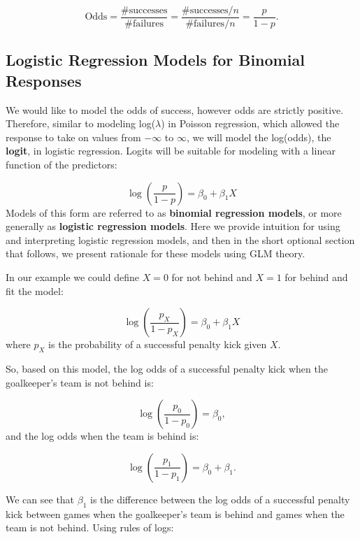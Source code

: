 \documentclass[
]{krantz}
\begin{document}
\[\textrm{Odds} = \frac{\# \textrm{successes}}{\# \textrm{failures}}=
\frac{\# \textrm{successes}/n}{\# \textrm{failures}/n}=
\frac{p}{1-p}.\]

\hypertarget{logistic-regression-models-for-binomial-responses}{%
\subsection{Logistic Regression Models for Binomial Responses}\label{logistic-regression-models-for-binomial-responses}}

We would like to model the odds of success, however odds are strictly positive. Therefore, similar to modeling log(\(\lambda\)) in Poisson regression, which allowed the response to take on values from \(-\infty\) to \(\infty\), we will model the log(odds), the \textbf{logit},  in logistic regression. Logits will be suitable for modeling with a linear function of the predictors:

\begin{equation*}
\log\left(\frac{p}{1 - p}\right)=\beta_0+\beta_1X 
 \end{equation*}
Models of this form are referred to as \textbf{binomial regression models},  or more generally as \textbf{logistic regression models}.  Here we provide intuition for using and interpreting logistic regression models, and then in the short optional section that follows, we present rationale for these models using GLM theory.

In our example we could define \(X=0\) for not behind and \(X=1\) for behind and fit the model:

\begin{equation}
\log\left(\frac{p_X}{1-p_X}\right)=\beta_0 +\beta_1X
\label{eq:logitXform}
\end{equation}
where \(p_X\) is the probability of a successful penalty kick given \(X\).

So, based on this model, the log odds of a successful penalty kick when the goalkeeper's team is not behind is:

\[
\log\left(\frac{p_0}{1-p_0}\right) =\beta_0 \nonumber,
\]
and the log odds when the team is behind is:

\[
\log\left(\frac{p_1}{1-p_1}\right)=\beta_0+\beta_1. \nonumber
\]

We can see that \(\beta_1\) is the difference between the log odds of a successful penalty kick between games when the goalkeeper's team is behind and games when the team is not behind. Using rules of logs:
\end{document}
